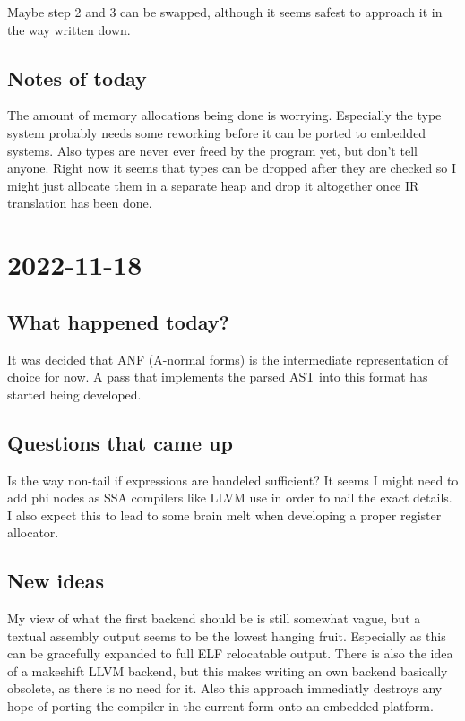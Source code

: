 \documentclass[12pt, article]{article}
\begin{document}
Maybe step 2 and 3 can be swapped, although it seems safest to
approach it in the way written down.

\subsection{Notes of today}

The amount of memory allocations being done is worrying.
Especially the type system probably needs some reworking before it can
be ported to embedded systems.
Also types are never ever freed by the program yet, but don't tell
anyone.
Right now it seems that types can be dropped after they are checked so
I might just allocate them in a separate heap and drop it altogether
once IR translation has been done.

\section{2022-11-18}

\subsection{What happened today?}

It was decided that ANF (A-normal forms) is the intermediate
representation of choice for now.
A pass that implements the parsed AST into this format has started
being developed.

\subsection{Questions that came up}

Is the way non-tail if expressions are handeled sufficient?
It seems I might need to add phi nodes as SSA compilers like LLVM use
in order to nail the exact details.
I also expect this to lead to some brain melt when developing a proper
register allocator.

\subsection{New ideas}

My view of what the first backend should be is still somewhat vague,
but a textual assembly output seems to be the lowest hanging fruit.
Especially as this can be gracefully expanded to full ELF relocatable
output.
There is also the idea of a makeshift LLVM backend, but this makes
writing an own backend basically obsolete, as there is no need for
it.
Also this approach immediatly destroys any hope of porting the
compiler in the current form onto an embedded platform.
\end{document}
